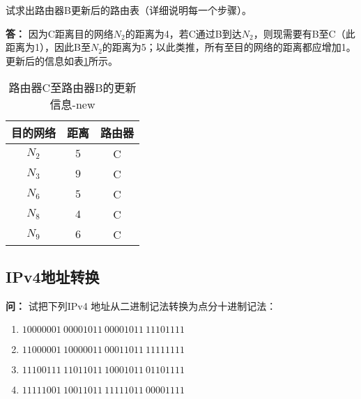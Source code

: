 \documentclass[12pt,hyperref,a4paper,UTF8]{ctexart}
\begin{document}
试求出路由器B更新后的路由表（详细说明每一个步骤）。

\textbf{答：}
因为C距离目的网络$N_2$的距离为4，若C通过B到达$N_2$，则现需要有B至C（此距离为1），因此B至$N_2$的距离为5；以此类推，所有至目的网络的距离都应增加1。更新后的信息如表\ref{tab:updates_new}所示。
\begin{table}[H]
    \centering
    \begin{tabular}{c|c|c}
    \toprule
    目的网络 & 距离 & 路由器\\
    \midrule
    $N_2$ & $5$ & C\\
    $N_3$ & $9$ & C\\
    $N_6$ & $5$ & C\\
    $N_8$ & $4$ & C\\
    $N_9$ & $6$ & C\\
    \bottomrule
    \end{tabular}
    \caption{路由器C至路由器B的更新信息-new}
    \label{tab:updates_new}
\end{table}

\begin{table}[H]
    \centering
    \caption{更新后的路由器B的路由表}
    \label{tab:router_b_new}
\end{table}



\subsection{IPv4地址转换}
\textbf{问：}
试把下列IPv4 地址从二进制记法转换为点分十进制记法：
\begin{enumerate}[label=\Roman*)]
    \item $10000001 \ 00001011 \ 00001011 \ 11101111$
    \item $11000001 \ 10000011 \ 00011011 \ 11111111$
    \item $11100111 \ 11011011 \ 10001011 \ 01101111$
    \item $11111001 \ 10011011 \ 11111011 \ 00001111$
\end{enumerate}
\end{document}

